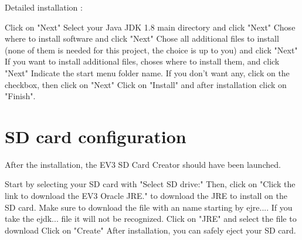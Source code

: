 \documentclass{article}
\begin{document}
Detailed installation :

Click on "Next"
Select your Java JDK 1.8 main directory and click "Next"
Chose where to install software and click "Next"
Chose all additional files to install (none of them is needed for this project, the choice is up to you) and click "Next"
If you want to install additional files, choses where to install them, and click "Next"
Indicate the start menu folder name. If you don't want any, click on the checkbox, then click on "Next"
Click on "Install" and after installation click on "Finish".

\section{SD card configuration}

After the installation, the EV3 SD Card Creator should have been launched.

Start by selecting your SD card with "Select SD drive:"
Then, click on "Click the link to download the EV3 Oracle JRE." to download the JRE to install on the SD card.
Make sure to download the file with an name starting by ejre.... If you take the ejdk... file it will not be recognized.
Click on "JRE" and select the file to download
Click on "Create"
After installation, you can safely eject your SD card.
\end{document}
